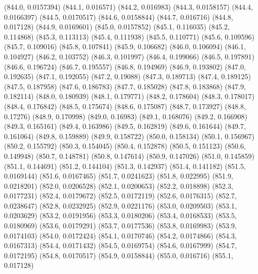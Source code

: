 {					(844.0, 0.0157394)
					(844.1, 0.016571)
					(844.2, 0.016983)
					(844.3, 0.0158157)
					(844.4, 0.0166397)
					(844.5, 0.0170517)
					(844.6, 0.0158844)
					(844.7, 0.016716)
					(844.8, 0.017128)
					(844.9, 0.0169601)
					(845.0, 0.0157852)
					(845.1, 0.116035)
					(845.2, 0.114868)
					(845.3, 0.113113)
					(845.4, 0.111938)
					(845.5, 0.110771)
					(845.6, 0.109596)
					(845.7, 0.109016)
					(845.8, 0.107841)
					(845.9, 0.106682)
					(846.0, 0.106094)
					(846.1, 0.104927)
					(846.2, 0.103752)
					(846.3, 0.101997)
					(846.4, 0.199066)
					(846.5, 0.197891)
					(846.6, 0.196724)
					(846.7, 0.195557)
					(846.8, 0.194969)
					(846.9, 0.193802)
					(847.0, 0.192635)
					(847.1, 0.192055)
					(847.2, 0.19088)
					(847.3, 0.189713)
					(847.4, 0.189125)
					(847.5, 0.187958)
					(847.6, 0.186783)
					(847.7, 0.185028)
					(847.8, 0.183868)
					(847.9, 0.182114)
					(848.0, 0.180939)
					(848.1, 0.179771)
					(848.2, 0.178604)
					(848.3, 0.178017)
					(848.4, 0.176842)
					(848.5, 0.175674)
					(848.6, 0.175087)
					(848.7, 0.173927)
					(848.8, 0.17276)
					(848.9, 0.170998)
					(849.0, 0.16983)
					(849.1, 0.168076)
					(849.2, 0.166908)
					(849.3, 0.165161)
					(849.4, 0.163986)
					(849.5, 0.162819)
					(849.6, 0.161644)
					(849.7, 0.161064)
					(849.8, 0.159889)
					(849.9, 0.158722)
					(850.0, 0.158134)
					(850.1, 0.156967)
					(850.2, 0.155792)
					(850.3, 0.154045)
					(850.4, 0.152878)
					(850.5, 0.151123)
					(850.6, 0.149948)
					(850.7, 0.148781)
					(850.8, 0.147614)
					(850.9, 0.147026)
					(851.0, 0.145859)
					(851.1, 0.144691)
					(851.2, 0.144104)
					(851.3, 0.142937)
					(851.4, 0.141182)
					(851.5, 0.0169144)
					(851.6, 0.0167465)
					(851.7, 0.0241623)
					(851.8, 0.022995)
					(851.9, 0.0218201)
					(852.0, 0.0206528)
					(852.1, 0.0200653)
					(852.2, 0.018898)
					(852.3, 0.0177231)
					(852.4, 0.0179672)
					(852.5, 0.0172119)
					(852.6, 0.0176315)
					(852.7, 0.0238647)
					(852.8, 0.0232925)
					(852.9, 0.0221176)
					(853.0, 0.0209503)
					(853.1, 0.0203629)
					(853.2, 0.0191956)
					(853.3, 0.0180206)
					(853.4, 0.0168533)
					(853.5, 0.0180969)
					(853.6, 0.0179291)
					(853.7, 0.0177536)
					(853.8, 0.0169983)
					(853.9, 0.0174103)
					(854.0, 0.0172424)
					(854.1, 0.0170746)
					(854.2, 0.0174866)
					(854.3, 0.0167313)
					(854.4, 0.0171432)
					(854.5, 0.0169754)
					(854.6, 0.0167999)
					(854.7, 0.0172195)
					(854.8, 0.0170517)
					(854.9, 0.0158844)
					(855.0, 0.016716)
					(855.1, 0.017128)
}
